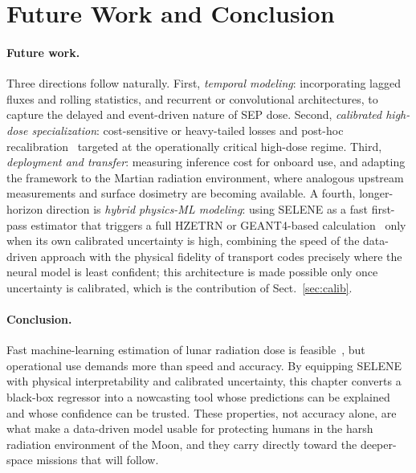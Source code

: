 \documentclass[graybox]{SNmult}
\begin{document}
\section{Future Work and Conclusion}
\label{sec:conclusion}

\paragraph{Future work.}
Three directions follow naturally. First, \emph{temporal modeling}: incorporating
lagged fluxes and rolling statistics, and recurrent or convolutional
architectures, to capture the delayed and event-driven nature of SEP dose. Second,
\emph{calibrated high-dose specialization}: cost-sensitive or heavy-tailed losses
and post-hoc recalibration~\cite{kuleshov2018calibrated} targeted at the
operationally critical high-dose regime. Third, \emph{deployment and transfer}:
measuring inference cost for onboard use, and adapting the framework to the
Martian radiation environment, where analogous upstream measurements and surface
dosimetry are becoming available. A fourth, longer-horizon direction is
\emph{hybrid physics-ML modeling}: using SELENE as a fast first-pass estimator
that triggers a full HZETRN or GEANT4-based
calculation~\cite{Slaba2013,2022cosp...44.2697D} only when its own calibrated
uncertainty is high, combining the speed of the data-driven approach with the
physical fidelity of transport codes precisely where the neural model is least
confident; this architecture is made possible only once uncertainty is
calibrated, which is the contribution of Sect.~\ref{sec:calib}.

\paragraph{Conclusion.}
Fast machine-learning estimation of lunar radiation dose is
feasible~\cite{tummala2025selene}, but operational use demands more than speed and
accuracy. By equipping SELENE with physical interpretability and calibrated
uncertainty, this chapter converts a black-box regressor into a nowcasting tool
whose predictions can be explained and whose confidence can be trusted. These
properties, not accuracy alone, are what make a data-driven model usable for
protecting humans in the harsh radiation environment of the Moon, and they carry
directly toward the deeper-space missions that will follow.



\end{document}
